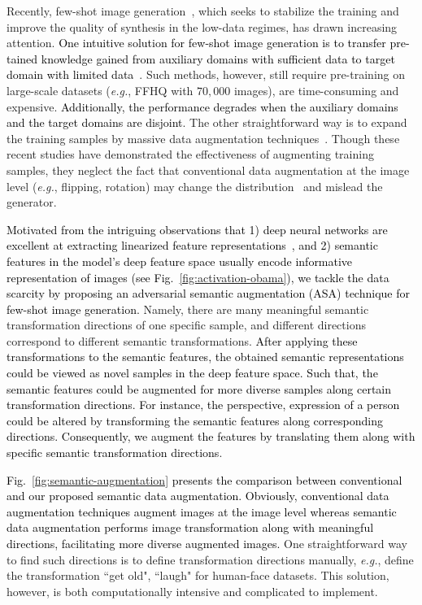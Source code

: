 \documentclass[10pt,journal,compsoc]{IEEEtran}
\newcommand{\revise}[1]{\textcolor{black}{#1}}
\begin{document}
Recently, few-shot image generation~\cite{liu2021towards, ojha2021fsgan, wang2022fregan, yang2023protogan, yang2023image}, which seeks to stabilize the training and improve the quality of synthesis in the low-data regimes, has drawn increasing attention.
%
\revise{One intuitive solution for few-shot image generation is to transfer pre-tained knowledge gained from auxiliary domains with sufficient data to target domain with limited data}~\cite{noguchi2019image, mo2020freeze, Wang2020CVPR}.
%
Such methods, however, still require pre-training on large-scale datasets (\emph{e.g.}, FFHQ with $70,000$ images), are time-consuming and expensive.
%
\revise{Additionally, the performance degrades when the auxiliary domains and the target domains are disjoint}.
%
The other straightforward way is to expand the training samples by massive data augmentation techniques~\cite{karras2020training, DiffAug, zhao2020improved}.
%
Though these recent studies have demonstrated the effectiveness of augmenting training samples, they neglect the fact that conventional data augmentation at the image level (\emph{e.g.}, flipping, rotation) may change the distribution~\cite{tran2021on, karras2020training} and mislead the generator.



\revise{Motivated from the intriguing observations that %
1) deep neural networks are excellent at extracting linearized feature representations~\cite{bengio2013better, upchurch2017deep, ISDATPAMI2021, li2021transferable},
and 2) semantic features in the model's deep feature space usually encode informative representation of images (see Fig.~\ref{fig:activation-obama}), we tackle the data scarcity by proposing an adversarial semantic augmentation (ASA) technique for few-shot image generation.
}
%
Namely, there are many meaningful semantic transformation directions of one specific sample, and different directions correspond to different semantic transformations.
%
\revise{After applying these transformations to the semantic features, the obtained semantic representations could be viewed as novel samples in the deep feature space.
%
Such that, the semantic features could be augmented for more diverse samples along certain transformation directions.
% 
\revise{For instance, the perspective, expression of a person could be altered by transforming the semantic features along corresponding directions}.
%
Consequently, we augment the features by translating them along with specific semantic transformation directions}.

\revise{Fig.~\ref{fig:semantic-augmentation} presents the comparison between conventional and our proposed semantic data augmentation.
%
Obviously, conventional data augmentation techniques augment images at the image level whereas semantic data augmentation performs image transformation along with meaningful directions, facilitating more diverse augmented images.}
%
One straightforward way to find such directions is to define transformation directions manually, \emph{e.g.}, define the transformation ``get old", ``laugh" for human-face datasets.
%
This solution, however, is both computationally intensive and complicated to implement.
\end{document}
